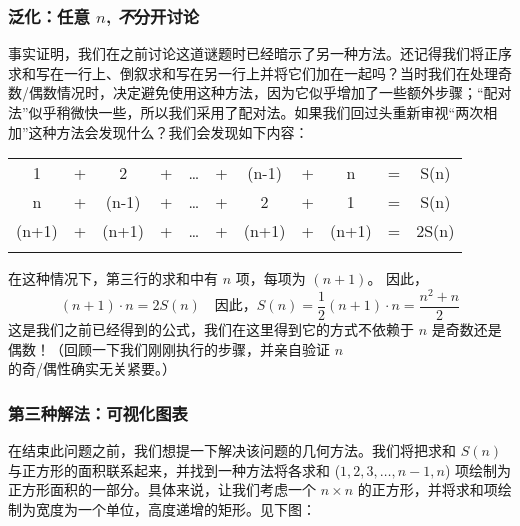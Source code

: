 \subsubsection*{泛化：任意 $n$, \textit{不}分开讨论}

事实证明，我们在之前讨论这道谜题时已经暗示了另一种方法。还记得我们将正序求和写在一行上、倒叙求和写在另一行上并将它们加在一起吗？当时我们在处理奇数/偶数情况时，决定避免使用这种方法，因为它似乎增加了一些额外步骤；``配对法''似乎稍微快一些，所以我们采用了配对法。如果我们回过头重新审视``两次相加''这种方法会发现什么？我们会发现如下内容：

\begin{center}
    \begin{tabular}{ccccccccccc}
           1  & + &     2 & + & \dots & + & (n-1) & + &     n & = & S(n)\\\noalign{\smallskip\smallskip}
           n  & + & (n-1) & + & \dots & + &     2 & + &     1 & = & S(n)\\\noalign{\smallskip\smallskip}
        \hline
        (n+1) & + & (n+1) & + & \dots & + & (n+1) & + & (n+1) & = & 2S(n)\\\noalign{\smallskip\smallskip}
    \end{tabular}
\end{center}
在这种情况下，第三行的求和中有 $n$ 项，每项为 $(n + 1)$。 因此，
\[(n+1) \cdot n = 2S(n) \quad \text{因此，} S(n) = \frac{1}{2}(n+1) \cdot n = \frac{n^2+n}{2}\]
这是我们之前已经得到的公式，我们在这里得到它的方式不依赖于 $n$ 是奇数还是偶数！（回顾一下我们刚刚执行的步骤，并亲自验证 $n$ 的奇/偶性确实无关紧要。）

\subsubsection*{第三种解法：可视化图表}

在结束此问题之前，我们想提一下解决该问题的几何方法。我们将把求和 $S(n)$ 与正方形的面积联系起来，并找到一种方法将各求和 ($1, 2, 3, \dots, n - 1, n$) 项绘制为正方形面积的一部分。具体来说，让我们考虑一个 $n \times n$ 的正方形，并将求和项绘制为宽度为一个单位，高度递增的矩形。见下图：

\begin{center}
\end{center}

